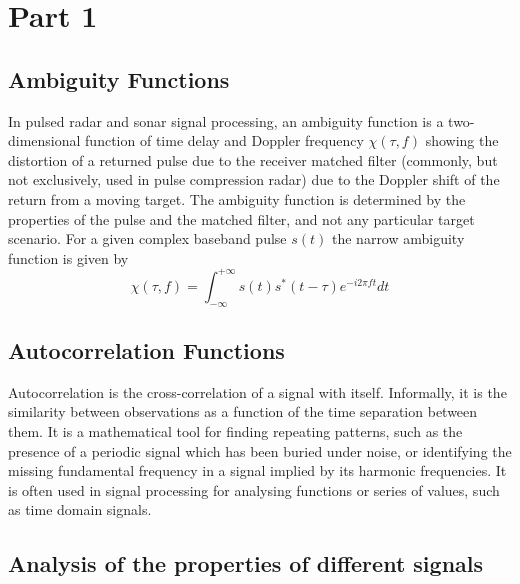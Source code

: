 \documentclass{article}
\begin{document}

\section{Part 1}
\label{sec:part1}
\subsection{Ambiguity Functions}
In pulsed radar and sonar signal processing, an ambiguity function is a two-dimensional function of time delay and Doppler frequency $\chi(\tau,f)$ showing the distortion of a returned pulse due to the receiver matched filter (commonly, but not exclusively, used in pulse compression radar) due to the Doppler shift of the return from a moving target. The ambiguity function is determined by the properties of the pulse and the matched filter, and not any particular target scenario. For a given complex baseband pulse $s(t)$ the narrow ambiguity function is given by\cite{Wiki:2012ambi} $$\chi(\tau,f)= \int_{-\infty}^{+\infty} s(t) s^{*}(t-\tau) e^{-i2 \pi ft} dt$$

\subsection{Autocorrelation Functions}
Autocorrelation is the cross-correlation of a signal with itself. Informally, it is the similarity between observations as a function of the time separation between them. It is a mathematical tool for finding repeating patterns, such as the presence of a periodic signal which has been buried under noise, or identifying the missing fundamental frequency in a signal implied by its harmonic frequencies. It is often used in signal processing for analysing functions or series of values, such as time domain signals.\cite{Wiki:2012auto}

\subsection{Analysis of the properties of different signals}
\end{document}
